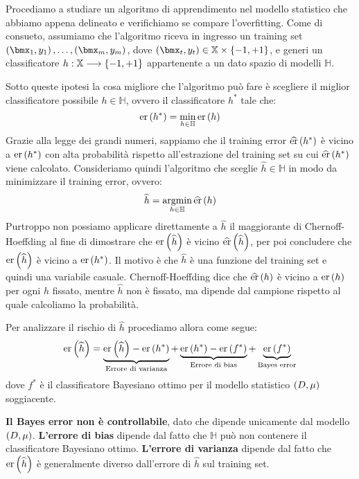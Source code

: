 \documentclass[\main/main.tex]{subfiles}
\begin{document}
\begin{observation}
    \begin{multicols}{2}
        Procediamo a studiare un algoritmo di apprendimento nel modello statistico che abbiamo appena delineato e verifichiamo se compare l'overfitting.
        Come di consueto, assumiamo che l'algoritmo riceva in ingresso un training set \(\examples{m}\), dove \(\rnd{\bmx_t, y_t} \in \mathbb{X} \times \crl{-1, +1}\), e generi un classificatore \(h:\mathbb{X}\longrightarrow \left\{-1, +1\right\}\) appartenente a un dato spazio di modelli \(\mathbb{H}\). 
    
        Sotto queste ipotesi la cosa migliore che l'algoritmo può fare è scegliere il miglior classificatore possibile \(h\in\mathbb{H}\), ovvero il classificatore \(h^*\) tale che:
        \[
            \text{er}\left(h^*\right) = \min_{h\in\mathbb{H}}\text{er}\left(h\right)
        \]
        Grazie alla legge dei grandi numeri, sappiamo che il training error \(\widehat{\text{er}}\left(h^*\right)\) è vicino a \(\text{er}\left(h^*\right)\) con alta probabilità rispetto all'estrazione del training set su cui \(\widehat{\text{er}}\left(h^*\right)\) viene calcolato. Consideriamo quindi l'algoritmo che sceglie \(\hat{h} \in \mathbb{H}\) in modo da minimizzare il training error, ovvero:
        \[
            \widehat{h} = \operatorname*{argmin}_{h\in\mathbb{H}}\widehat{\text{er}}\left(h\right)
        \]
        Purtroppo non possiamo applicare direttamente a \(\hat{h}\) il maggiorante di Chernoff-Hoeffding al fine di dimostrare che \(\text{er}\left(\widehat{h}\right)\) è vicino \(\widehat{\text{er}}\left(\widehat{h}\right)\), per poi concludere che \(\text{er}\left(\widehat{h}\right)\) è vicino a \(\text{er}\left(h^*\right)\). Il motivo è che \(\hat{h}\) è una funzione del training set e quindi una variabile casuale. Chernoff-Hoeffding dice che \(\widehat{\text{er}}\left(h\right)\) è vicino a \(\text{er}\left(h\right)\) per ogni \(h\) fissato, mentre \(\hat{h}\) non è fissato, ma dipende dal campione rispetto al quale calcoliamo la probabilità.

        Per analizzare il rischio di \(\hat{h}\) procediamo allora come segue:
        \[
            \text{er}\left(\widehat{h}\right) = \underbrace{\text{er}\left(\widehat{h}\right) - \text{er}\left(h^*\right)}_{\text{Errore di varianza}} + \underbrace{\text{er}\left(h^*\right) - \text{er}\left(f^*\right)}_{\text{Errore di bias}} + \underbrace{\text{er}\left(f^*\right)}_{\text{Bayes error}}
        \]
        dove \(f^*\) è il classificatore Bayesiano ottimo per il modello statistico \(\left(D, \mu\right)\) soggiacente.
        
        \textbf{Il Bayes error non è controllabile}, dato che dipende unicamente dal modello \(\left(D, \mu\right)\). \textbf{L'errore di bias} dipende dal fatto che \(\mathbb{H}\) può non contenere il classificatore Bayesiano ottimo. \textbf{L'errore di varianza} dipende dal fatto che \(\text{er}\left(\widehat{h}\right)\) è generalmente diverso dall'errore di \(\hat{h}\) sul training set.
        

\end{multicols}
\end{observation}
\end{document}
